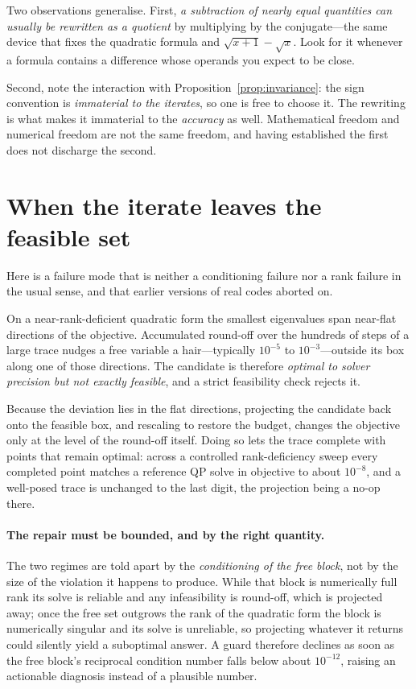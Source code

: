 Two observations generalise. First, \emph{a subtraction of nearly equal quantities can
usually be rewritten as a quotient} by multiplying by the conjugate---the same device
that fixes the quadratic formula and $\sqrt{x+1}-\sqrt{x}$. Look for it whenever a
formula contains a difference whose operands you expect to be close.

Second, note the interaction with Proposition~\ref{prop:invariance}: the sign convention
is \emph{immaterial to the iterates}, so one is free to choose it. The rewriting is what
makes it immaterial to the \emph{accuracy} as well. Mathematical freedom and numerical
freedom are not the same freedom, and having established the first does not discharge
the second.

\section{When the iterate leaves the feasible set}

Here is a failure mode that is neither a conditioning failure nor a rank failure in the
usual sense, and that earlier versions of real codes aborted on.

On a near-rank-deficient quadratic form the smallest eigenvalues span near-flat
directions of the objective. Accumulated round-off over the hundreds of steps of a large
trace nudges a free variable a hair---typically $10^{-5}$ to $10^{-3}$---outside its box
along one of those directions. The candidate is therefore \emph{optimal to solver
precision but not exactly feasible}, and a strict feasibility check rejects it.

Because the deviation lies in the flat directions, projecting the candidate back onto
the feasible box, and rescaling to restore the budget, changes the objective only at the
level of the round-off itself. Doing so lets the trace complete with points that remain
optimal: across a controlled rank-deficiency sweep every completed point matches a
reference QP solve in objective to about $10^{-8}$, and a well-posed trace is unchanged
to the last digit, the projection being a no-op there.

\paragraph{The repair must be bounded, and by the right quantity.} The two regimes are
told apart by the \emph{conditioning of the free block}, not by the size of the violation
it happens to produce. While that block is numerically full rank its solve is reliable
and any infeasibility is round-off, which is projected away; once the free set outgrows
the rank of the quadratic form the block is numerically singular and its solve is
unreliable, so projecting whatever it returns could silently yield a suboptimal answer.
A guard therefore declines as soon as the free block's reciprocal condition number falls
below about $10^{-12}$, raising an actionable diagnosis instead of a plausible number.

